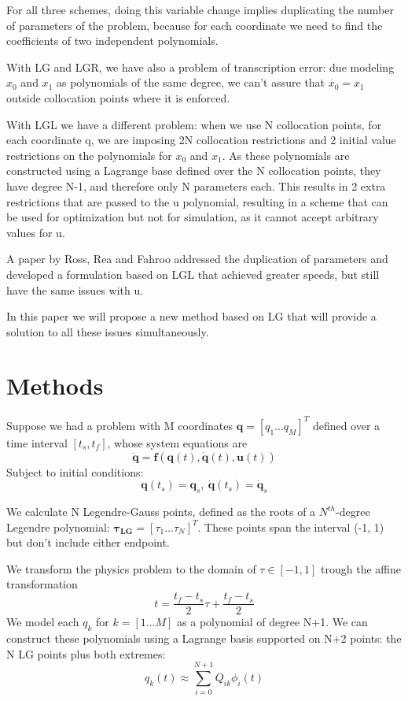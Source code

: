 \documentclass[twoside,twocolumn]{article}
\renewcommand{\vec}[1]{\bm{#1}}
\begin{document}
For all three schemes, doing this variable change implies duplicating the number of parameters of the problem, because for each coordinate we need to find the coefficients of two independent polynomials. 

With LG and LGR, we have also a problem of transcription error: due modeling $x_0$ and $x_1$ as polynomials of the same degree, we can't assure that $\dot{x_0} = x_1$ outside collocation points where it is enforced.

With LGL we have a different problem: when we use N collocation points, for each coordinate q, we are imposing 2N collocation restrictions and 2 initial value restrictions on the polynomials for $x_0$ and $x_1$. As these polynomials are constructed using a Lagrange base defined over the N collocation points, they have degree N-1, and therefore only N parameters each. This results in 2 extra restrictions that are passed to the u polynomial, resulting in a scheme that can be used for optimization but not for simulation, as it cannot accept arbitrary values for u.

A paper by Ross, Rea and Fahroo \cite{ross_02} addressed the duplication of parameters and developed a formulation based on LGL that achieved greater speeds, but still have the same issues with u.

In this paper we will propose a new method based on LG that will provide a solution to all these issues simultaneously.

\section{Methods}

Suppose we had a problem with M coordinates $\vec{q} = [q_1...q_M]^T$ defined over a time interval $[t_s, t_f]$, whose system equations are $$\vec{\ddot{q}} = \vec{f}(\vec{q}(t), \dot{\vec{q}}(t), \vec{u}(t))$$
Subject to initial conditions:
$$\vec{q}(t_s) = \vec{q}_s,\ \vec{\dot{q}}(t_s) = \vec{\dot{q}}_s$$

We calculate N Legendre-Gauss points, defined as the roots of a $N^{th}$-degree Legendre polynomial: $\vec{\tau_{LG}} = [\tau_1 ... \tau_{N}]^T$. These points span the interval (-1, 1) but don't include either endpoint.

We transform the physics problem to the domain of $\tau \in [-1, 1]$ trough the affine transformation 
$$t = \frac{t_f - t_s}{2}\tau + \frac{t_f - t_s}{2}$$
We model each $q_k$ for $k = [1...M]$ as a polynomial of degree N+1. We can construct these polynomials using a Lagrange basis supported on N+2 points: the N LG points plus both extremes:
$$q_k(t) \approx \sum_{i=0}^{N+1}Q_{ik}\phi_i(t)$$
\end{document}
